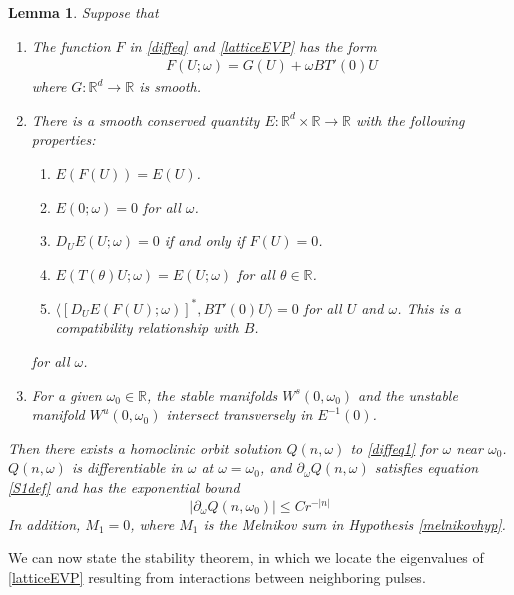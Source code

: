 \documentclass[12pt]{article}
\def\R{{\mathbb R}}
\newtheorem{lemma}{Lemma}
\begin{document}
\begin{lemma}\label{geneigcriteria}
Suppose that
\begin{enumerate}
\item The function $F$ in \eqref{diffeq} and \eqref{latticeEVP} has the form
\begin{align}\label{Fwithomega}
F(U; \omega) = G(U) + \omega B T'(0) U
\end{align}
where $G: \R^d \rightarrow \R$ is smooth.
\item There is a smooth conserved quantity $E: \R^d \times \R \rightarrow \R$ with the following properties:
\begin{enumerate}
    \item $E(F(U)) = E(U)$.
    \item $E(0; \omega) = 0$ for all $\omega$.
    \item $D_U E(U; \omega) = 0$ if and only if $F(U) = 0$.
    \item $E(T(\theta) U; \omega) = E(U; \omega)$ for all $\theta \in \R$.
    \item $\langle [D_U E(F(U); \omega)]^*, B T'(0) U \rangle = 0$ for all $U$ and $\omega$. This is a compatibility relationship with $B$.
\end{enumerate}

\begin{equation}
\end{equation}
for all $\omega$.
\item For a given $\omega_0 \in \R$, the stable manifolds $W^s(0, \omega_0)$ and the unstable manifold $W^u(0, \omega_0)$ intersect transversely in $E^{-1}(0)$. 
\end{enumerate}
Then there exists a homoclinic orbit solution $Q(n, \omega)$ to \eqref{diffeq1} for $\omega$ near $\omega_0$. $Q(n, \omega)$ is differentiable in $\omega$ at $\omega = \omega_0$, and $\partial_\omega Q(n, \omega)$ satisfies equation \eqref{S1def} and has the exponential bound
\begin{equation}\label{Qomegabound}
|\partial_\omega Q(n, \omega_0)| \leq C r^{-|n|}
\end{equation}
In addition, $M_1 = 0$, where $M_1$ is the Melnikov sum in Hypothesis \ref{melnikovhyp}.
\end{lemma}

We can now state the stability theorem, in which we locate the eigenvalues of \eqref{latticeEVP} resulting from interactions between neighboring pulses.
\end{document}

